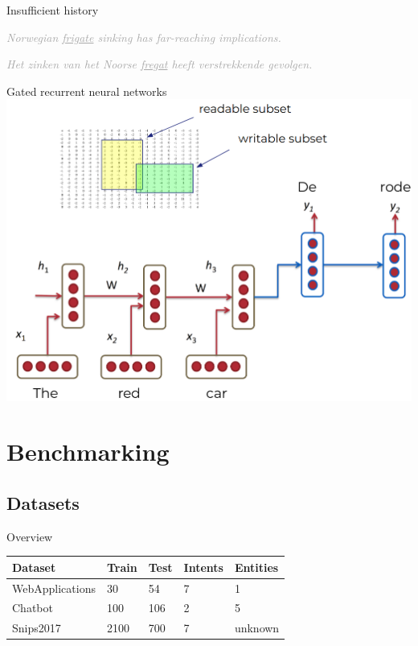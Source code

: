 \documentclass[pdf]{beamer}
\newcommand{\entity}[1]{\textcolor{ao(english)}{#1}}
\newcommand{\intent}[1]{\textcolor{azure(colorwheel)}{#1}}
\newcommand{\demo}[1]{\textit{\textcolor{darkgray}{#1}}}
\begin{document}
    \begin{frame}{Insufficient history}
        \begin{center}
            \demo{Norwegian \underline{frigate} sinking has far-reaching implications.}
        \end{center}
        \begin{center}
            \demo{Het zinken van het Noorse \underline{fregat} heeft verstrekkende gevolgen.}
        \end{center}
    \end{frame}

    \begin{frame}{Gated recurrent neural networks}
        \includegraphics[height=0.9\textheight]{figures/gru.png}
    \end{frame}
    \section{Benchmarking}
    \subsection{Datasets}
    \begin{frame}{Overview}
        \begin{tabular}{l l l l l}
            \textbf{Dataset} & \textbf{Train} & \textbf{Test} & \textbf{\intent{Intents}} & \textbf{\entity{Entities}}\\
            \hline
            WebApplications & 30 & 54 & 7 & 1\\

            Chatbot & 100 & 106 & 2 & 5\\
            Snips2017 & 2100 & 700 & 7 & unknown\\
        \end{tabular}
    \end{frame}
\end{document}
